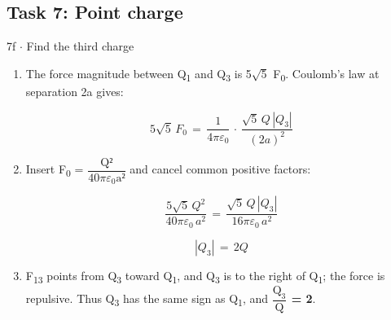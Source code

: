 \documentclass[11pt]{article}
\begin{document}
\begin{keepsection}\subsection{Task 7: Point charge}

\begin{workedbox}{7f \ensuremath{\cdot} Find the third charge}
\begin{enumerate}
\item {}
The force magnitude between Q\textsubscript{1} and Q\textsubscript{3} is 5\ensuremath{\sqrt{5}} F\textsubscript{0}. Coulomb’s law at separation 2a gives:

\begin{equation*}5\sqrt{5}\, {F}_{0}\, =\, \dfrac{1}{4πε_{0}}\, \cdot \, \dfrac{\sqrt{5}\, {Q}\, |{Q}_{3}|}{(2{a})^{2}}\end{equation*}
\item {}
Insert F\textsubscript{0} = {\small\ensuremath{\dfrac{\mathrm{Q}²}{40πε_{0}\mathrm{a}²}}} and cancel common positive factors:

\begin{equation*}\dfrac{5\sqrt{5}\, {Q}^{2}}{40πε_{0}\, {a}^{2}}\, =\, \dfrac{\sqrt{5}\, {Q}\, |{Q}_{3}|}{16πε_{0}\, {a}^{2}}\end{equation*}

\begin{equation*}|{Q}_{3}|\, =\, 2{Q}\end{equation*}
\item F\textsubscript{13} points from Q\textsubscript{3} toward Q\textsubscript{1}, and Q\textsubscript{3} is to the right of Q\textsubscript{1}; the force is repulsive. Thus Q\textsubscript{3} has the same sign as Q\textsubscript{1}, and \textbf{{\small\ensuremath{\dfrac{\mathrm{Q}_{3}}{\mathrm{Q}}}} = 2}.
\end{enumerate}
\end{workedbox}

\end{keepsection}
\end{document}
